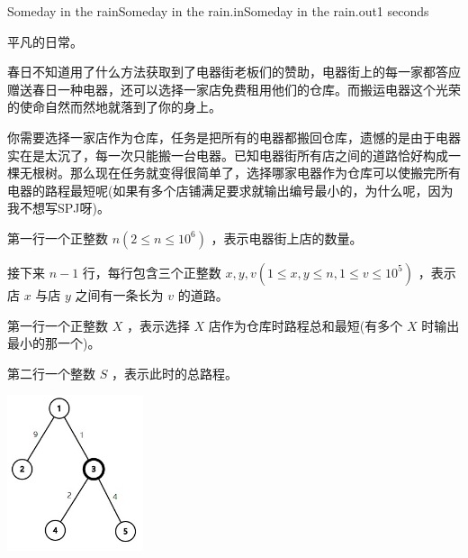 \begin{problem}{Someday in the rain}{Someday in the rain.in}{Someday in the rain.out}{1 seconds}

平凡的日常。

春日不知道用了什么方法获取到了电器街老板们的赞助，电器街上的每一家都答应赠送春日一种电器，还可以选择一家店免费租用他们的仓库。而搬运电器这个光荣的使命自然而然地就落到了你的身上。

你需要选择一家店作为仓库，任务是把所有的电器都搬回仓库，遗憾的是由于电器实在是太沉了，每一次只能搬一台电器。已知电器街所有店之间的道路恰好构成一棵无根树。那么现在任务就变得很简单了，选择哪家电器作为仓库可以使搬完所有电器的路程最短呢(如果有多个店铺满足要求就输出编号最小的，为什么呢，因为我不想写SPJ呀)。

\InputFile

第一行一个正整数 $n (2 \leq n \leq 10^6)$ ，表示电器街上店的数量。

接下来 $n-1$ 行，每行包含三个正整数 $x,y,v (1 \leq x,y \leq n,1 \leq v \leq 10^5)$ ，表示店 $x$ 与店 $y$ 之间有一条长为 $v$ 的道路。 

\OutputFile

第一行一个正整数 $X$ ，表示选择 $X$ 店作为仓库时路程总和最短(有多个 $X$ 时输出最小的那一个)。

第二行一个整数 $S$ ，表示此时的总路程。

\Example
\begin{example}
%
\end{example}
\begin{center}
\includegraphics[width=0.3\textwidth]{pics/H.jpg}
\end{center}
\end{problem}
